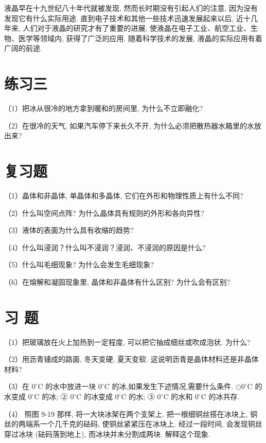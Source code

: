 \documentclass[10pt]{article}
\begin{document}
液晶早在十九世纪八十年代就被发现, 然而长时期没有引起人们的注意, 因为没有发现它有什么实际用途. 直到电子技术和其他一些技术迅速发展起来以后, 近十几年来, 人们对于液晶的研究才有了重要的进展, 使液晶在电子工业、航空工业、生物、医学等领域内, 获得了广泛的应用. 随着科学技术的发展, 液晶的实际应用有着广阔的前途.

\section*{练习三}

（1）把冰从很冷的地方拿到暖和的房间里, 为什么不立即融化?

（2）在很冷的天气, 如果汽车停下来长久不开, 为什么必须把散热器水箱里的水放出来?

\section*{复习题}

（1）晶体和非晶体, 单晶体和多晶体, 它们在外形和物理性质上有什么不同?

（2）什么叫空间点阵? 为什么晶体具有规则的外形和各向异性?

（3）液体的表面为什么具有收缩的趋势?

（4）什么叫浸润？什么叫不浸润？浸润、不浸润的原因是什么?

（5）什么叫毛细现象? 为什么会发生毛细现象?

（6）在熔解和凝固现象里, 晶体和非晶体有什么区别? 为什么会有区别?

\section*{习 题}

（1）把玻璃放在火上加热到一定程度, 可以把它抽成细丝或吹成泡状. 为什么?

（2）用沥青铺成的路面, 冬天变硬, 夏天变软. 这说明沥青是晶体材料还是非晶体材料?

（3）在 \({0}^{ \circ }\mathrm{C}\) 的水中放进一块 \({0}^{ \circ }\mathrm{C}\) 的冰,如果发生下述情况,需要什么条件. \(\odot {0}^{ \circ }\mathrm{C}\) 的水变成 \({0}^{ \circ }\mathrm{C}\) 的冰; ② \({0}^{ \circ }\mathrm{C}\) 的冰变成 \({0}^{ \circ }\mathrm{C}\) 的水; ③ \({0}^{ \circ }\mathrm{C}\) 的水和 \({0}^{ \circ }\mathrm{C}\) 的冰共存.

（4） 照图 9-19 那样, 将一大块冰架在两个支架上. 把一根细铜丝搭在冰块上, 铜丝的两端系一个几千克的砝码, 使铜丝紧紧压在冰块上. 经过一段时间, 会发现铜丝穿过冰块 (砝码落到地上), 而冰块并未分割成两块. 解释这个现象.
\end{document}

